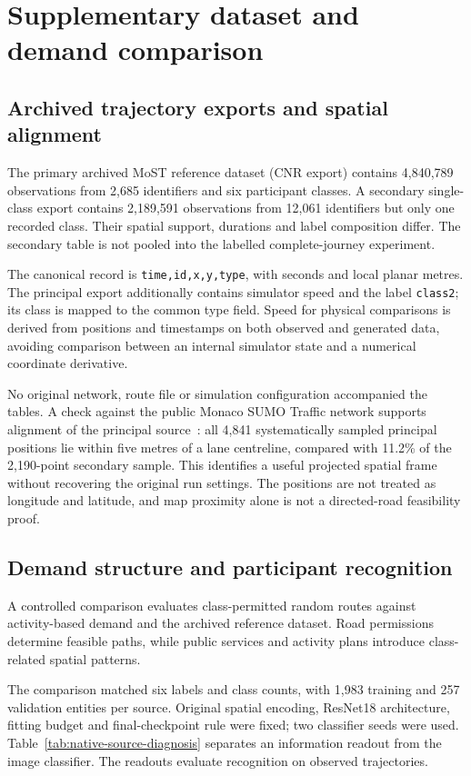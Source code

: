 \section{Supplementary dataset and demand comparison}\label{app:source-comparison}
\subsection{Archived trajectory exports and spatial alignment}
The primary archived MoST reference dataset (CNR export) contains 4,840,789 observations from 2,685 identifiers and six participant classes. A secondary single-class export contains 2,189,591 observations from 12,061 identifiers but only one recorded class. Their spatial support, durations and label composition differ. The secondary table is not pooled into the labelled complete-journey experiment.

The canonical record is \texttt{time,id,x,y,type}, with seconds and local planar metres. The principal export additionally contains simulator speed and the label \texttt{class2}; its class is mapped to the common type field. Speed for physical comparisons is derived from positions and timestamps on both observed and generated data, avoiding comparison between an internal simulator state and a numerical coordinate derivative.

No original network, route file or simulation configuration accompanied the tables. A check against the public Monaco SUMO Traffic network supports alignment of the principal source~\cite{most}: all 4,841 systematically sampled principal positions lie within five metres of a lane centreline, compared with 11.2\% of the 2,190-point secondary sample. This identifies a useful projected spatial frame without recovering the original run settings. The positions are not treated as longitude and latitude, and map proximity alone is not a directed-road feasibility proof.

\subsection{Demand structure and participant recognition}
A controlled comparison evaluates class-permitted random routes against activity-based demand and the archived reference dataset. Road permissions determine feasible paths, while public services and activity plans introduce class-related spatial patterns.

The comparison matched six labels and class counts, with 1,983 training and 257 validation entities per source. Original spatial encoding, ResNet18 architecture, fitting budget and final-checkpoint rule were fixed; two classifier seeds were used. Table~\ref{tab:native-source-diagnosis} separates an information readout from the image classifier. The readouts evaluate recognition on observed trajectories.

